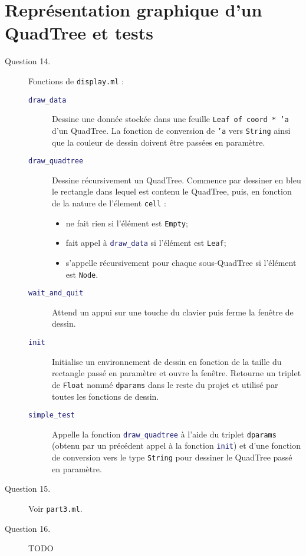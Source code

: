 \documentclass[11pt]{scrartcl}
\newcommand{\functionname}[1]{\texttt{\textcolor{MidnightBlue}{#1}}}
\newcommand{\filename}[1]{\texttt{\textcolor{RawSienna}{#1}}}
\newcommand{\code}[1]{\texttt{#1}}
\begin{document}
\section{Représentation graphique d'un QuadTree et tests}

\begin{description}
\item[Question 14.] Fonctions de \filename{display.ml} :
\begin{description}
\item[\functionname{draw_data}] Dessine une donnée stockée dans une feuille \code{Leaf of coord * 'a} d'un QuadTree. La fonction de conversion de \code{'a} vers \code{String} ainsi que la couleur de dessin doivent être passées en paramètre.
\item[\functionname{draw_quadtree}] Dessine récursivement un QuadTree. Commence par dessiner en bleu le rectangle dans lequel est contenu le QuadTree, puis, en fonction de la nature de l'élement \code{cell} :
\begin{itemize}
\item ne fait rien si l'élément est \code{Empty};
\item fait appel à \functionname{draw_data} si l'élément est \code{Leaf};
\item s'appelle récursivement pour chaque sous-QuadTree si l'élément est \code{Node}.
\end{itemize}
\item[\functionname{wait_and_quit}] Attend un appui sur une touche du clavier puis ferme la fenêtre de dessin.
\item[\functionname{init}] Initialise un environnement de dessin en fonction de la taille du rectangle passé en paramètre et ouvre la fenêtre. Retourne un triplet de \code{Float} nommé \code{dparams} dans le reste du projet et utilisé par toutes les fonctions de dessin. 
\item[\functionname{simple_test}] Appelle la fonction \functionname{draw_quadtree} à l'aide du triplet \code{dparams} (obtenu par un précédent appel à la fonction \functionname{init}) et d'une fonction de conversion vers le type \code{String} pour dessiner le QuadTree passé en paramètre.
\end{description}

\item[Question 15.] Voir \filename{part3.ml}.


\item[Question 16.] TODO
\end{description}
\end{document}
